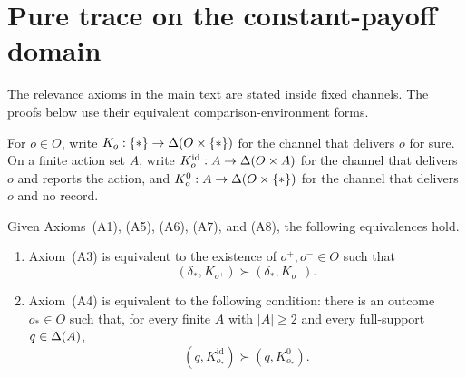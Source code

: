 \section{Pure trace on the constant-payoff domain}
\label{pt:sec:environment}\label{lf:app:pure-trace}

The relevance axioms in the main text are stated inside fixed channels.  The
proofs below use their equivalent comparison-environment forms.

For $o\in O$, write $K_o:\{\ast\}\to\Delta(O\times\{\ast\})$ for the channel that
delivers $o$ for sure.  On a finite action set $A$, write
$K^{\mathrm{id}}_o:A\to\Delta(O\times A)$ for the channel that delivers $o$ and
reports the action, and $K^0_o:A\to\Delta(O\times\{\ast\})$ for the channel that
delivers $o$ and no record.

\begin{lemma}\label{lem:relevance-bridge}
Given Axioms~\textup{(A1)}, \textup{(A5)}, \textup{(A6)},
\textup{(A7)}, and \textup{(A8)}, the following equivalences hold.
\begin{enumerate}[label=\textup{(\alph*)},leftmargin=*]
\item Axiom~\textup{(A3)} is equivalent to the existence of
  $o^+,o^-\in O$ such that
  \[
    (\delta_\ast,K_{o^+})\succ(\delta_\ast,K_{o^-}).
  \]
\item Axiom~\textup{(A4)} is equivalent to the following condition: there is
  an outcome $o_\ast\in O$ such that, for every finite $A$ with $|A|\ge2$
  and every full-support $q\in\Delta(A)$,
  \[
    (q,K^{\mathrm{id}}_{o_\ast})\succ(q,K^0_{o_\ast}).
  \]
\end{enumerate}
\end{lemma}


